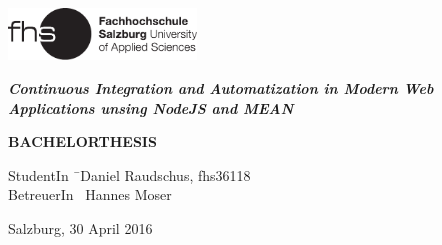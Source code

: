 \begin{titlepage}
\begin{center}

\includegraphics[width=5cm]{images/FHSLogo.pdf}

\vspace*{4cm}

\Large{
	\textit{\textbf{Continuous Integration and Automatization in Modern Web Applications unsing NodeJS and MEAN}}
}

\vspace*{4cm}

\large{
	\textbf{BACHELORTHESIS}
}

\end{center}

\vfill

\begin{tabbing}
StudentIn \= \ Daniel Raudschus, fhs36118 \\
BetreuerIn \> \ Hannes Moser
\end{tabbing}

Salzburg, 30 April 2016

\end{titlepage}
